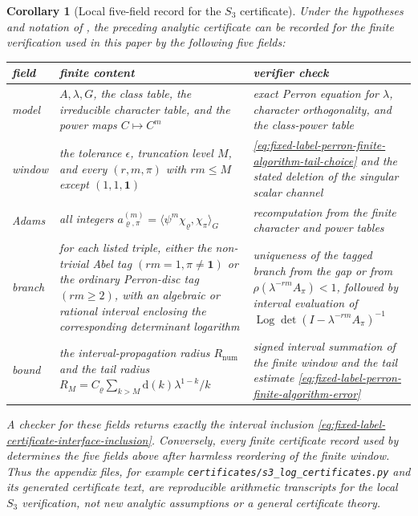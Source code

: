 \documentclass[11pt,a4paper]{amsart}
\theoremstyle{plain}
\newtheorem{corollary}[theorem]{Corollary}
\theoremstyle{definition}
\theoremstyle{remark}
\DeclareMathOperator{\Log}{Log}
\begin{document}
\begin{corollary}[Local five-field record for the \texorpdfstring{\(S_3\)}{S3} certificate]
  \label{cor:fixed-label-five-field-certificate-schema}
  Under the hypotheses and notation of
  , the preceding
  analytic certificate can be recorded for the finite verification used in
  this paper by the following five fields:
  \begin{center}
  \small
  \begin{tabular}{@{}L{0.19\textwidth}L{0.33\textwidth}L{0.36\textwidth}@{}}
    \toprule
    field & finite content & verifier check\\
    \midrule
    model
      & \(A,\lambda,G\), the class table, the irreducible character table,
        and the power maps \(C\mapsto C^m\)
      & exact Perron equation for \(\lambda\), character orthogonality, and
        the class-power table\\
    window
      & the tolerance \(\epsilon\), truncation level \(M\), and every
        \((r,m,\pi)\) with \(rm\le M\) except \((1,1,\mathbf1)\)
      & \eqref{eq:fixed-label-perron-finite-algorithm-tail-choice} and the
        stated deletion of the singular scalar channel\\
    Adams
      & all integers \(a_{\varrho,
        \pi}^{(m)}=\langle\psi^m\chi_\varrho,\chi_\pi\rangle_G\)
      & recomputation from the finite character and power tables\\
    branch
      & for each listed triple, either the non-trivial Abel tag
        \((rm=1,\pi\ne\mathbf1)\) or the ordinary Perron-disc tag
        \((rm\ge2)\), with an algebraic or rational interval enclosing the
        corresponding determinant logarithm
      & uniqueness of the tagged branch from the gap or from
        \(\rho(\lambda^{-rm}A_\pi)<1\), followed by interval evaluation of
        \(\Log\det(I-\lambda^{-rm}A_\pi)^{-1}\)\\
    bound
      & the interval-propagation radius \(R_{\mathrm{num}}\) and the tail
        radius \(R_M=C_\varrho\sum_{k>M}\mathrm d(k)\lambda^{1-k}/k\)
      & signed interval summation of the finite window and the tail estimate
        \eqref{eq:fixed-label-perron-finite-algorithm-error}\\
    \bottomrule
  \end{tabular}
  \end{center}
  A checker for these fields returns exactly the interval inclusion
  \eqref{eq:fixed-label-certificate-interface-inclusion}.  Conversely, every
  finite certificate record used by
   determines the five
  fields above after harmless reordering of the finite window.  Thus the
  appendix files, for example
  \texttt{certificates/s3\_log\_certificates.py} and its generated certificate
  text, are reproducible arithmetic transcripts for the local \(S_3\)
  verification, not new analytic assumptions or a general certificate theory.
\end{corollary}
\end{document}
